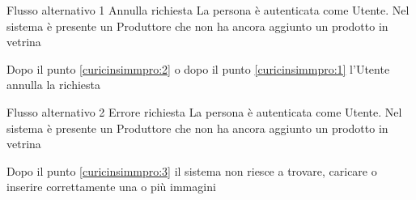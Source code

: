 %
{Flusso alternativo 1}%
{Annulla richiesta}%
{La persona è autenticata come Utente. Nel sistema è presente un Produttore che non ha ancora aggiunto un prodotto in vetrina}%
{\postNulle}%
{\begin{enumCU}
		\item Dopo il punto \ref{curicinsimmpro:2} o dopo il punto \ref{curicinsimmpro:1} l'Utente annulla la richiesta
	\end{enumCU}}%
%
{Flusso alternativo 2}%
{Errore richiesta}%
{La persona è autenticata come Utente. Nel sistema è presente un Produttore che non ha ancora aggiunto un prodotto in vetrina}%
{\postNulle}%
{\begin{enumCU}
		\item Dopo il punto \ref{curicinsimmpro:3} il sistema non riesce a trovare, caricare o inserire correttamente una o più immagini
	\end{enumCU}}%

\tabcuvspace

